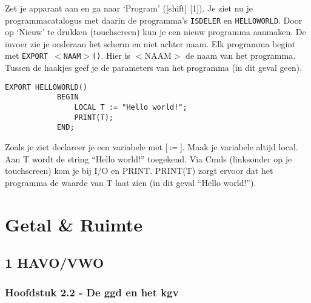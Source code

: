 \documentclass[a4paper]{article}
\newcounter{opdracht}
\begin{document}
Zet je apparaat aan en ga naar `Program' ([shift] [1]).
Je ziet nu je programmacatalogus met daarin de programma's \texttt{ISDELER} en \texttt{HELLOWORLD}. 
Door op `Nieuw' te drukken (touchscreen) kun je een nieuw programma aanmaken. De invoer zie je onderaan het scherm en niet achter naam.
Elk programma begint met \texttt{EXPORT $<$NAAM$>$()}. Hier is $<$NAAM$>$ de naam van het programma. Tussen de haakjes geef je de parameters van het programma (in dit geval geen). \\
	\begin{minipage}{\textwidth}
		\begin{lstlisting}[caption={\texttt{HELLOWORLD}},label=helloworld]
			EXPORT HELLOWORLD()
			BEGIN
				LOCAL T := "Hello world!";
				PRINT(T);
			END;
		\end{lstlisting}
	\end{minipage}
Zoals je ziet declareer je een variabele met [{$\coloneqq$}]. Maak je variabele altijd local. 
Aan T wordt de string ``Hello world!'' toegekend. 
Via Cmds (linksonder op je touchscreen) kom je bij I/O en PRINT. 
PRINT(T) zorgt ervoor dat het programma de waarde van T laat zien (in dit geval ``Hello world!'').



\clearpage
{}
\section*{Getal \& Ruimte}
\subsection*{1 HAVO/VWO}
\subsubsection{Hoofdstuk 2.2 - De ggd en het kgv}

\end{document}
